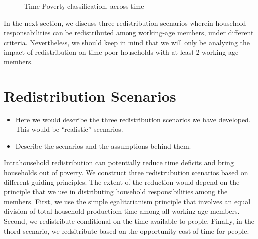\documentclass[
  11pt,
]{article}
\begin{document}
\begin{figure}


\caption{\label{fig-composition}Time Poverty classification, across
time}

\end{figure}%

In the next section, we discuss three redistribution scenarios wherein
household responsabilities can be redistributed among working-age
members, under different criteria. Nevertheless, we should keep in mind
that we will only be analyzing the impact of redistribution on time poor
households with at least 2 working-age members.

\section{Redistribution Scenarios}\label{redistribution-scenarios}

\begin{itemize}
\item
  Here we would describe the three redistribution scenarios we have
  developed. This would be ``realistic'' scenarios.
\item
  Describe the scenarios and the assumptions behind them.
\end{itemize}

Intrahousehold redistribution can potentially reduce time deficits and
bring households out of poverty. We construct three redistrubution
scenarios based on different guiding principles. The extent of the
reduction would depend on the principle that we use in distributing
household responsibilities among the members. First, we use the simple
egalitarianism principle that involves an equal division of total
household productiom time among all working age members. Second, we
redistribute conditional on the time available to people. Finally, in
the thord scenario, we redsitribute based on the opportunity cost of
time for people.
\end{document}
